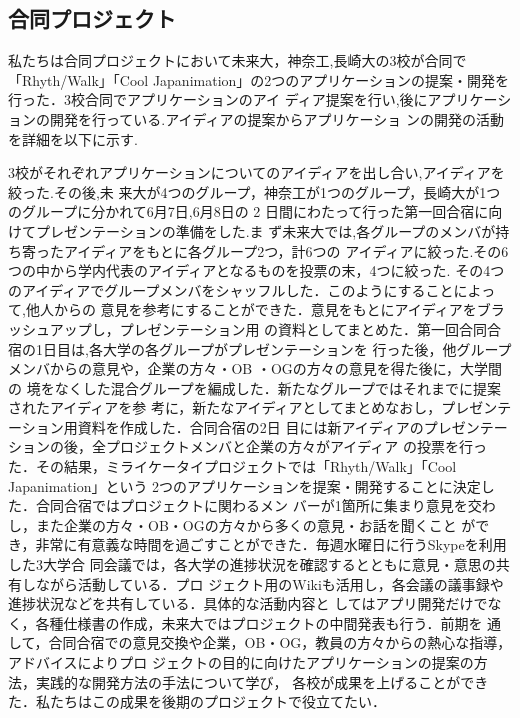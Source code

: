 \subsection{合同プロジェクト}

\par 私たちは合同プロジェクトにおいて未来大，神奈工,長崎大の3校が合同で「Rhyth/Walk」「Cool
Japanimation」の2つのアプリケーションの提案・開発を行った．3校合同でアプリケーションのアイ
ディア提案を行い,後にアプリケーションの開発を行っている.アイディアの提案からアプリケーショ
ンの開発の活動を詳細を以下に示す.
\par 3校がそれぞれアプリケーションについてのアイディアを出し合い,アイディアを絞った.その後,未
来大が4つのグループ，神奈工が1つのグループ，長崎大が1つのグループに分かれて6月7日,6月8日の 2 日間にわたって行った第一回合宿に向けてプレゼンテーションの準備をした.ま
ず未来大では,各グループのメンバが持ち寄ったアイディアをもとに各グループ2つ，計6つの
アイディアに絞った.その6つの中から学内代表のアイディアとなるものを投票の末，4つに絞った.
その4つのアイディアでグループメンバをシャッフルした．このようにすることによって,他人からの
意見を参考にすることができた．意見をもとにアイディアをブラッシュアップし，プレゼンテーション用
の資料としてまとめた．第一回合同合宿の1日目は,各大学の各グループがプレゼンテーションを
行った後，他グループメンバからの意見や，企業の方々・OB ・OGの方々の意見を得た後に，大学間の
境をなくした混合グループを編成した．新たなグループではそれまでに提案されたアイディアを参
考に，新たなアイディアとしてまとめなおし，プレゼンテーション用資料を作成した．合同合宿の2日
目には新アイディアのプレゼンテーションの後，全プロジェクトメンバと企業の方々がアイディア
の投票を行った．その結果，ミライケータイプロジェクトでは「Rhyth/Walk」「Cool Japanimation」という
2つのアプリケーションを提案・開発することに決定した．合同合宿ではプロジェクトに関わるメン
バーが1箇所に集まり意見を交わし，また企業の方々・OB・OGの方々から多くの意見・お話を聞くこと
ができ，非常に有意義な時間を過ごすことができた．毎週水曜日に行うSkypeを利用した3大学合
同会議では，各大学の進捗状況を確認するとともに意見・意思の共有しながら活動している．プロ
ジェクト用のWikiも活用し，各会議の議事録や進捗状況などを共有している．具体的な活動内容と
してはアプリ開発だけでなく，各種仕様書の作成，未来大ではプロジェクトの中間発表も行う．前期を
通して，合同合宿での意見交換や企業，OB・OG，教員の方々からの熱心な指導，アドバイスによりプロ
ジェクトの目的に向けたアプリケーションの提案の方法，実践的な開発方法の手法について学び，
各校が成果を上げることができた．私たちはこの成果を後期のプロジェクトで役立てたい．
